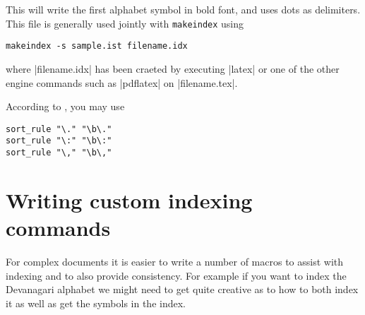 This will write the first alphabet symbol in bold font, and uses dots as delimiters. This file is generally  used jointly with \texttt{makeindex} using

\verb|makeindex -s sample.ist filename.idx|

where |filename.idx| has been craeted by executing |latex| or one of the other engine commands such as |pdflatex| on |filename.tex|.


According to \citep{gabora}, you may use

\begin{verbatim}
sort_rule "\." "\b\."
sort_rule "\:" "\b\:"
sort_rule "\," "\b\,"
\end{verbatim}


\section{Writing custom indexing commands}

For complex documents it is easier to write a number of macros to assist with indexing and to also provide consistency. For example if you want to index the Devanagari alphabet we might need to get quite creative as to how to both index it as well as get the symbols in the index.
\DeclareRobustCommand\ta{{\tibetan ༃ }}

%
%
%























